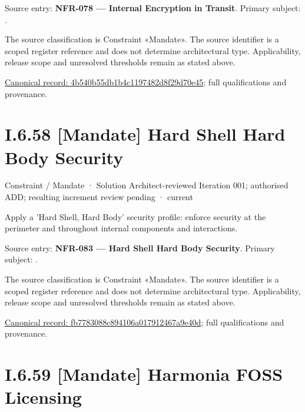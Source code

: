 Source entry: \textbf{NFR-078 — Internal Encryption in Transit}. Primary subject: \texttt{}.



The source classification is Constraint «Mandate». The source identifier is a scoped register reference and does not determine architectural type. Applicability, release scope and unresolved thresholds remain as stated above.


{\footnotesize \href{../../../../../../../../continuum/motivation/constraint/mandate/4b540b55db1b4c1197482d8f29d70e45.md}{Canonical record: 4b540b55db1b4c1197482d8f29d70e45}; full qualifications and provenance.}\par
\section*{I.6.58 [Mandate] Hard Shell Hard Body Security}
\label{navigation:I.6.58}

\label{element:fb7783088c894106a017912467a9e40d}
{\small Constraint / Mandate · Solution Architect-reviewed Iteration 001; authorised ADD; resulting increment review pending · current}\par

Apply a 'Hard Shell, Hard Body' security profile: enforce security at the perimeter and throughout internal components and interactions.



Source entry: \textbf{NFR-083 — Hard Shell Hard Body Security}. Primary subject: \texttt{}.



The source classification is Constraint «Mandate». The source identifier is a scoped register reference and does not determine architectural type. Applicability, release scope and unresolved thresholds remain as stated above.


{\footnotesize \href{../../../../../../../../continuum/motivation/constraint/mandate/fb7783088c894106a017912467a9e40d.md}{Canonical record: fb7783088c894106a017912467a9e40d}; full qualifications and provenance.}\par
\section*{I.6.59 [Mandate] Harmonia FOSS Licensing}
\label{navigation:I.6.59}

